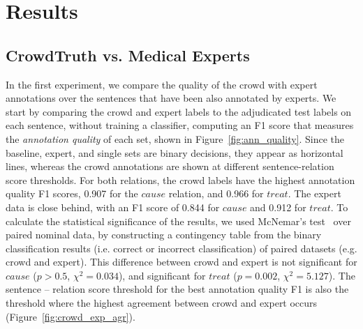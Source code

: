\section{Results}

\subsection{CrowdTruth vs. Medical Experts}
\label{sec:res_exp}

In the first experiment, we compare the quality of the crowd with expert annotations over the sentences that have been also annotated by experts.  We start by comparing the crowd and expert labels to the adjudicated test labels on each sentence, without training a classifier, computing an F1 score that measures the {\em annotation quality} of each set, shown in Figure~\ref{fig:ann_quality}. Since the baseline, expert, and single sets are binary decisions, they appear as horizontal lines, whereas the crowd annotations are shown at different sentence-relation score thresholds. For both relations, the crowd labels have the highest annotation quality F1 scores, 0.907 for the $cause$ relation, and 0.966 for $treat$. The expert data is close behind, with an F1 score of 0.844 for $cause$ and 0.912 for $treat$. To calculate the statistical significance of the results, we used McNemar's test~\cite{mcnemar1947note} over paired nominal data, by constructing a contingency table from the binary classification results (i.e. correct or incorrect classification) of paired datasets (e.g. crowd and expert). This difference between crowd and expert is not significant for $cause$ ($p > 0.5$, $\chi^2 = 0.034$), and significant for $treat$ ($p = 0.002$, $\chi^2 = 5.127$). The sentence -- relation score threshold for the best annotation quality F1 is also the threshold where the highest agreement between crowd and expert occurs (Figure~\ref{fig:crowd_exp_agr}).

